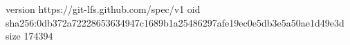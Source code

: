 version https://git-lfs.github.com/spec/v1
oid sha256:0db372a72228653634947c1689b1a25486297afe19ec0e5db3e5a50ae1d49e3d
size 174394
